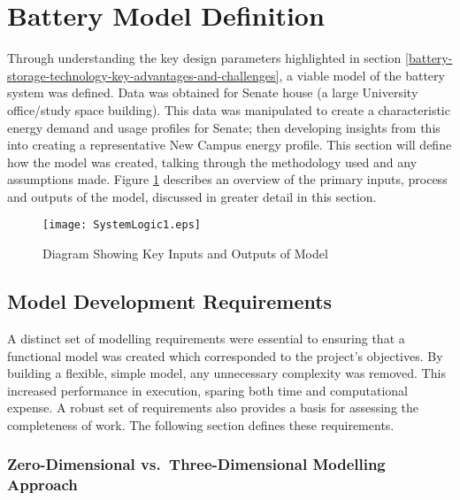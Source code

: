 \section{Battery Model Definition}\label{battery-model-definition}

Through understanding the key design parameters highlighted in section
\ref{battery-storage-technology-key-advantages-and-challenges}, a viable
model of the battery system was defined. Data was obtained for Senate
house (a large University office/study space building). This data was
manipulated to create a characteristic energy demand and usage profiles
for Senate; then developing insights from this into creating a
representative New Campus energy profile. This section will define how
the model was created, talking through the methodology used and any
assumptions made. Figure \ref{SystemLogic1} describes an overview of the
primary inputs, process and outputs of the model, discussed in greater
detail in this section.

\begin{figure}[H]
 \centering
 \texttt{[image: SystemLogic1.eps]}
 \caption{Diagram Showing Key Inputs and Outputs of Model}
 \label{SystemLogic1}
 \end{figure}

\subsection{Model Development
Requirements}\label{model-development-requirements}

A distinct set of modelling requirements were essential to ensuring that
a functional model was created which corresponded to the project's
objectives. By building a flexible, simple model, any unnecessary
complexity was removed. This increased performance in execution, sparing
both time and computational expense. A robust set of requirements also
provides a basis for assessing the completeness of work. The following
section defines these requirements.

\subsubsection{Zero-Dimensional vs.~Three-Dimensional Modelling
Approach}\label{zero-dimensional-vs.three-dimensional-modelling-approach}

